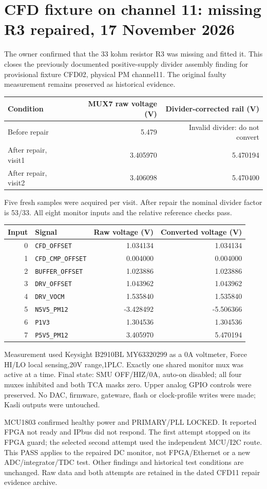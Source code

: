 \clearpage
\section{CFD fixture on channel 11: missing R3 repaired, 17 November 2026}
The owner confirmed that the 33 kohm resistor R3 was missing and fitted it.
This closes the previously documented positive-supply divider assembly finding
for provisional fixture CFD02, physical PM channel11. The original faulty
measurement remains preserved as historical evidence.
\begin{center}\begin{tabular}{lrr}\toprule
Condition & MUX7 raw voltage (V) & Divider-corrected rail (V)\\\midrule
Before repair & 5.479 & Invalid divider: do not convert\\
After repair, visit1 & 3.405970 & 5.470194\\
After repair, visit2 & 3.406098 & 5.470400\\\bottomrule
\end{tabular}\end{center}
Five fresh samples were acquired per visit. After repair the nominal divider
factor is 53/33. All eight monitor inputs and the relative reference checks pass.
\begin{center}\begin{tabular}{rlrr}\toprule
Input & Signal & Raw voltage (V) & Converted voltage (V)\\\midrule
0 & \texttt{CFD\_OFFSET} & 1.034134 & 1.034134 \\
1 & \texttt{CFD\_CMP\_OFFSET} & 0.004000 & 0.004000 \\
2 & \texttt{BUFFER\_OFFSET} & 1.023886 & 1.023886 \\
3 & \texttt{DRV\_OFFSET} & 1.043962 & 1.043962 \\
4 & \texttt{DRV\_VOCM} & 1.535840 & 1.535840 \\
5 & \texttt{N5V5\_PM12} & -3.428492 & -5.506366 \\
6 & \texttt{P1V3} & 1.304536 & 1.304536 \\
7 & \texttt{P5V5\_PM12} & 3.405970 & 5.470194 \\
\bottomrule\end{tabular}\end{center}
Measurement used Keysight B2910BL MY63320299 as a 0A voltmeter, Force HI/LO
local sensing,20V range,1PLC. Exactly one shared monitor mux was active at a time.
Final state: SMU OFF/HIZ/0A, auto-on disabled; all four muxes inhibited and both
TCA masks zero. Upper analog GPIO controls were preserved. No DAC, firmware,
gateware, flash or clock-profile writes were made; Kasli outputs were untouched.

MCU1803 confirmed healthy power and PRIMARY/PLL LOCKED. It reported FPGA not
ready and IPbus did not respond. The first attempt stopped on its FPGA guard;
the selected second attempt used the independent MCU/I2C route. This PASS applies
to the repaired DC monitor, not FPGA/Ethernet or a new ADC/integrator/TDC test.
Other findings and historical test conditions are unchanged. Raw data and both
attempts are retained in the dated CFD11 repair evidence archive.
